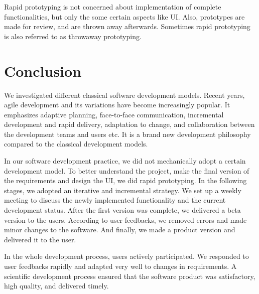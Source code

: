 Rapid prototyping is not concerned about implementation of complete functionalities, but only the some certain aspects like UI. Also, prototypes are made for review, and are thrown away afterwards. Sometimes rapid prototyping is also referred to as throwaway prototyping.

\section{Conclusion}
We investigated different classical software development models. Recent years, agile development and its variations have become increasingly popular. It emphasizes adaptive planning, face-to-face communication, incremental development and rapid delivery, adaptation to change, and collaboration between the development teams and users etc. It is a brand new development philosophy compared to the classical development models.

In our software development practice, we did not mechanically adopt a certain development model. To better understand the project, make the final version of the requirements and design the UI, we did rapid prototyping. In the following stages, we adopted an iterative and incremental strategy. We set up a weekly meeting to discuss the newly implemented functionality and the current development status. After the first version was complete, we delivered a beta version to the users. According to user feedbacks, we removed errors and made minor changes to the software. And finally, we made a product version and delivered it to the user.

In the whole development process, users actively participated. We responded to user feedbacks rapidly and adapted very well to changes in requirements. A scientific development process ensured that the software product was satisfactory, high quality, and delivered timely. 